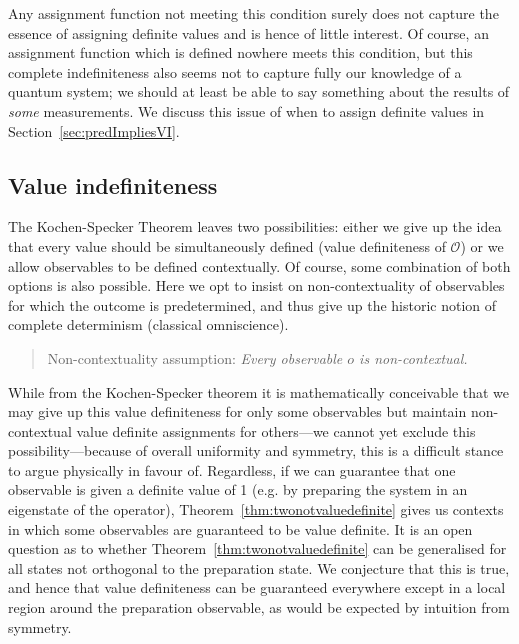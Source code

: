 \documentclass[11pt, a4paper]{article}
\theoremstyle{definition}
\begin{document}
Any assignment function not meeting this condition surely does not capture the essence of assigning definite values and is hence of little interest.
Of course, an assignment function which is defined nowhere meets this condition, but this complete indefiniteness also seems not to capture fully our knowledge of a quantum system; we should at least be able to say something about the results of \emph{some} measurements.
We discuss this issue of when to assign definite values in Section~\ref{sec:predImpliesVI}.

\subsection{Value indefiniteness}

The Kochen-Specker Theorem leaves two possibilities: either we give up the idea that every value should be simultaneously defined (value definiteness of $\mathcal{O}$) or we allow observables to be defined contextually. Of course, some combination of both options is also possible.
Here we opt to insist on non-contextuality of observables for which the outcome is predetermined, and thus give up the historic notion of complete determinism (classical omniscience).
\begin{quote} Non-contextuality assumption: {\em Every observable $o$ is non-contextual.}
\end{quote}

While from the Kochen-Specker theorem it is mathematically conceivable that we may give up this value definiteness for only some observables but maintain non-contextual value definite assignments for others---we cannot yet exclude this possibility---because of overall uniformity and symmetry, this is a difficult stance to argue physically in favour of.
Regardless, if we can guarantee that one observable is given a definite value of 1 (e.g. by preparing the system in an eigenstate of the operator), Theorem~\ref{thm:twonotvaluedefinite} gives us contexts in which some observables are guaranteed to be value definite.
It is an open question as to whether Theorem~\ref{thm:twonotvaluedefinite} can be generalised for all states not orthogonal to the preparation state.
We conjecture that this is true, and hence that value definiteness can be guaranteed everywhere except in a local region around the preparation observable, as would be expected by intuition from symmetry.
\end{document}
